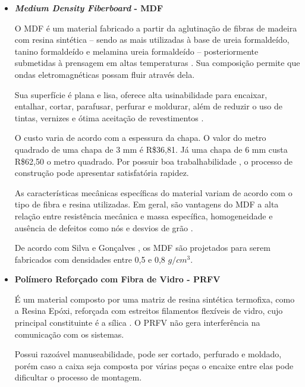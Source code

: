 \begin{itemize}
    \item \textbf{\textit{Medium Density Fiberboard} - MDF}
     \par O MDF é um material fabricado a partir da aglutinação de fibras de madeira com resina sintética – sendo as mais utilizadas à base de ureia formaldeído, tanino formaldeído e melamina ureia formaldeído –  posteriormente submetidas à prensagem em altas temperaturas  \cite{gomes}.  Sua composição permite que ondas eletromagnéticas possam fluir através dela.
     
    \par Sua superfície é plana e lisa, oferece alta usinabilidade para encaixar, entalhar, cortar, parafusar, perfurar e moldurar, além de reduzir o uso de tintas, vernizes e ótima aceitação de revestimentos \cite{CAMPOS}.
    
    \par O custo varia de acordo com a espessura da chapa. O valor do metro quadrado de uma chapa de 3 mm é R\$36,81. Já uma chapa de 6 mm custa R\$62,50 o metro quadrado.  Por possuir boa trabalhabilidade \cite{eleoterio2000propriedades}, o processo de construção pode apresentar satisfatória rapidez.  
    
    \par As características mecânicas específicas do material variam de acordo com o tipo de fibra e resina utilizadas. Em geral, são vantagens do MDF a alta relação entre resistência mecânica e massa específica, homogeneidade e ausência de defeitos como nós e desvios de grão \cite{eleoterio2000propriedades}. 
    
    \par De acordo com Silva e Gonçalves \cite{da2007avaliaccao}, os MDF são projetados para serem fabricados com densidades entre 0,5 e 0,8 $g/cm^3$.

    \item \textbf{Polímero Reforçado com Fibra de Vidro - PRFV}
    
    \par É um material composto por uma matriz de resina sintética termofixa, como a Resina Epóxi, reforçada com estreitos filamentos flexíveis de vidro, cujo principal constituinte é a sílica \cite{pierin2005estudo}. O PRFV não gera interferência na comunicação com os sistemas. 
    
    \par Possui razoável manuseabilidade, pode ser cortado, perfurado e moldado, porém caso a caixa seja composta por várias peças o encaixe entre elas pode dificultar o processo de montagem.    
    

\end{itemize}
